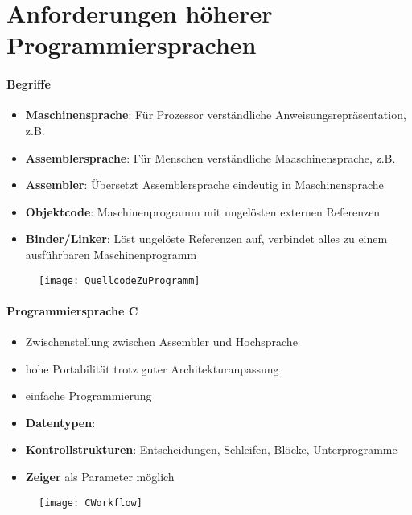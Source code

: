 \section{Anforderungen höherer Programmiersprachen}
\label{sec:anforderungen}

\paragraph{Begriffe}
\begin{itemize}
  \item \textbf{Maschinensprache}: Für Prozessor verständliche Anweisungsrepräsentation, z.B. 
  \item \textbf{Assemblersprache}: Für Menschen verständliche Maaschinensprache, z.B. 
  \item \textbf{Assembler}: Übersetzt Assemblersprache eindeutig in Maschinensprache
  \item \textbf{Objektcode}: Maschinenprogramm mit ungelösten externen Referenzen
  \item \textbf{Binder/Linker}: Löst ungelöste Referenzen auf, verbindet alles zu einem ausführbaren Maschinenprogramm
\end{itemize}
\begin{figure}[ht]
  \centering
  \texttt{[image: QuellcodeZuProgramm]}
  \label{QuellcodeZuProgramm}
\end{figure}

\paragraph{Programmiersprache C}
\begin{itemize}
  \item Zwischenstellung zwischen Assembler und Hochsprache
  \item hohe Portabilität trotz guter Architekturanpassung
  \item einfache Programmierung
  \item \textbf{Datentypen}: 
  \item \textbf{Kontrollstrukturen}: Entscheidungen, Schleifen, Blöcke, Unterprogramme
  \item \textbf{Zeiger} als Parameter möglich
\end{itemize}
\begin{figure}[ht]
  \centering
  \texttt{[image: CWorkflow]}
  \label{CWorkflow}
\end{figure}

